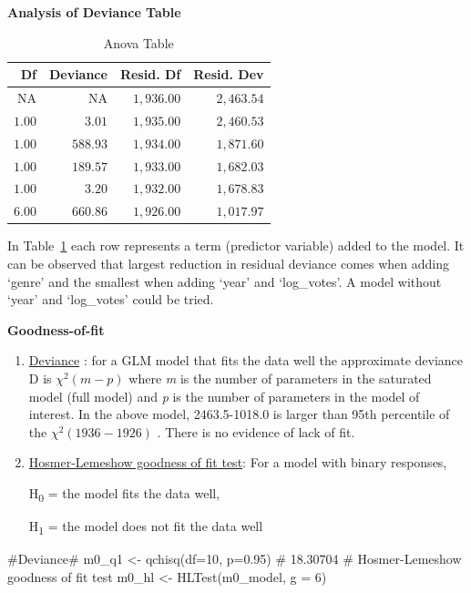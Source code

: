 \documentclass[
  letterpaper,
  DIV=11,
  numbers=noendperiod]{scrartcl}
\newenvironment{Shaded}{\begin{snugshade}}{\end{snugshade}}
\newcommand{\AttributeTok}[1]{\textcolor[rgb]{0.40,0.45,0.13}{#1}}
\newcommand{\CommentTok}[1]{\textcolor[rgb]{0.37,0.37,0.37}{#1}}
\newcommand{\DecValTok}[1]{\textcolor[rgb]{0.68,0.00,0.00}{#1}}
\newcommand{\FloatTok}[1]{\textcolor[rgb]{0.68,0.00,0.00}{#1}}
\newcommand{\FunctionTok}[1]{\textcolor[rgb]{0.28,0.35,0.67}{#1}}
\newcommand{\NormalTok}[1]{\textcolor[rgb]{0.00,0.23,0.31}{#1}}
\newcommand{\OtherTok}[1]{\textcolor[rgb]{0.00,0.23,0.31}{#1}}
\begin{document}
\textbf{Analysis of Deviance Table}

\hypertarget{tbl-dev}{}
\begin{longtable}{rrrr}
\caption{\label{tbl-dev}Anova Table }\tabularnewline

\toprule
Df & Deviance & Resid. Df & Resid. Dev \\ 
\midrule\addlinespace[2.5pt]
NA & NA & $1,936.00$ & $2,463.54$ \\ 
$1.00$ & $3.01$ & $1,935.00$ & $2,460.53$ \\ 
$1.00$ & $588.93$ & $1,934.00$ & $1,871.60$ \\ 
$1.00$ & $189.57$ & $1,933.00$ & $1,682.03$ \\ 
$1.00$ & $3.20$ & $1,932.00$ & $1,678.83$ \\ 
$6.00$ & $660.86$ & $1,926.00$ & $1,017.97$ \\ 
\bottomrule
\end{longtable}

In Table~\ref{tbl-dev} each row represents a term (predictor variable)
added to the model. It can be observed that largest reduction in
residual deviance comes when adding `genre' and the smallest when adding
`year' and `log\_votes'. A model without `year' and `log\_votes' could
be tried. \clearpage

\textbf{Goodness-of-fit}

\begin{enumerate}
\def\labelenumi{\arabic{enumi}.}
\item
  \ul{Deviance} : for a GLM model that fits the data well the
  approximate deviance D is \(\chi^2(m-p)\) where \emph{m} is the number
  of parameters in the saturated model (full model) and \emph{p} is the
  number of parameters in the model of interest. In the above model,
  2463.5-1018.0 is larger than 95th percentile of the
  \(\chi^2(1936-1926)\) . There is no evidence of lack of fit.
\item
  \ul{Hosmer-Lemeshow goodness of fit test}: For a model with binary
  responses,

  H\textsubscript{0} = the model fits the data well,

  H\textsubscript{1} = the model does not fit the data well
\end{enumerate}

\begin{Shaded}
\begin{Highlighting}[]
\CommentTok{\#Deviance\#}
\NormalTok{m0\_q1 }\OtherTok{\textless{}{-}} \FunctionTok{qchisq}\NormalTok{(}\AttributeTok{df=}\DecValTok{10}\NormalTok{, }\AttributeTok{p=}\FloatTok{0.95}\NormalTok{) }\CommentTok{\# 18.30704}
\CommentTok{\# Hosmer{-}Lemeshow goodness of fit test}
\NormalTok{m0\_hl }\OtherTok{\textless{}{-}} \FunctionTok{HLTest}\NormalTok{(m0\_model, }\AttributeTok{g =} \DecValTok{6}\NormalTok{)}
\end{Highlighting}
\end{Shaded}
\end{document}
